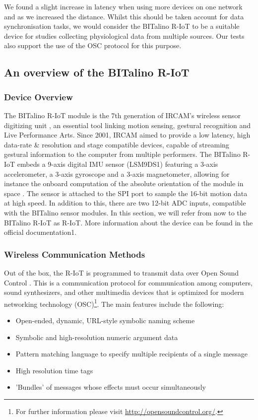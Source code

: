 We found a slight increase in latency when using more devices on one network and as we increased the distance. Whilst this should be taken account for data synchronisation tasks, we would consider the BITalino R-IoT to be a suitable device for studies collecting physiological data from multiple sources. Our tests also support the use of the OSC protocol for this purpose.

\subsection{An overview of the BITalino R-IoT}

\subsubsection{Device Overview}

The BITalino R-IoT module is the 7th generation of IRCAM's wireless sensor digitizing unit \cite{R-IoT}, an essential tool linking motion sensing, gestural recognition and Live Performance Arts. Since 2001, IRCAM aimed to provide a low latency, high data-rate & resolution and stage compatible devices, capable of streaming gestural information to the computer from multiple performers.  The BITalino R-IoT embeds a 9-axis digital IMU sensor (LSM9DS1) featuring a 3-axis accelerometer, a 3-axis gyroscope and a 3-axis magnetometer, allowing for instance the onboard computation of the absolute orientation of the module in space \cite{Matzka}. The sensor is attached to the SPI port to sample the 16-bit motion data at high speed. In addition to this, there are two 12-bit ADC inputs, compatible with the BITalino sensor modules. In this section, we will refer from now to the BITalino R-IoT as R-IoT. More information about the device can be found in the official documentation1.

\subsubsection{Wireless Communication Methods}
Out of the box, the R-IoT is programmed to transmit data over Open Sound Control . This is a communication protocol for communication among computers, sound synthesizers, and other multimedia devices that is optimized for modern networking technology (OSC)\footnote{For further information please visit \url{http://opensoundcontrol.org/}.}. The main features include the following:
\begin{itemize}
  \item Open-ended, dynamic, URL-style symbolic naming scheme
  \item Symbolic and high-resolution numeric argument data
  \item Pattern matching language to specify multiple recipients of a single message
  \item High resolution time tags
  \item 'Bundles' of messages whose effects must occur simultaneously
\end{itemize}

